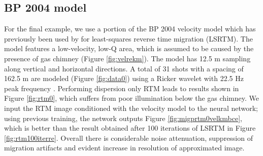 
\subsection{BP 2004 model}
\hspace{\parindent} For the final example, we use a portion of the BP 2004 velocity model which has previously been used by \cite{sun2016q} for least-squares reverse time migration (LSRTM). The model features a low-velocity, low-Q area, which is assumed to be caused by the presence of gas chimney (Figure \ref{fig:velrekm}). The model has 12.5 m sampling along vertical and horizontal directions. A total of 31 shots with a spacing of 162.5 m are modeled (Figure \ref{fig:data0}) using a Ricker wavelet with 22.5 Hz peak frequency \cite[]{sun2016q}. Performing dispersion only RTM leads to results shown in Figure \ref{fig:rtm0}, which suffers from poor illumination below the gas chimney. We input the RTM image conditioned with the velocity model to the neural network; using previous training, the network outputs Figure \ref{fig:migprtm0velkmbce}, which is better than the result obtained after 100 iterations of LSRTM in Figure \ref{fig:rtm100iterre}. Overall there is considerable noise attenuation, suppression of migration artifacts and evident increase in resolution of approximated image.  
 
